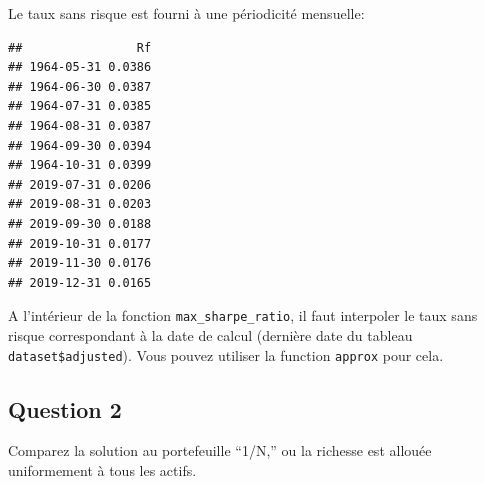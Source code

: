 \documentclass[
]{article}
\newenvironment{Shaded}{\begin{snugshade}}{\end{snugshade}}
\newcommand{\AttributeTok}[1]{\textcolor[rgb]{0.77,0.63,0.00}{#1}}
\newcommand{\ConstantTok}[1]{\textcolor[rgb]{0.00,0.00,0.00}{#1}}
\newcommand{\DecValTok}[1]{\textcolor[rgb]{0.00,0.00,0.81}{#1}}
\newcommand{\FloatTok}[1]{\textcolor[rgb]{0.00,0.00,0.81}{#1}}
\newcommand{\FunctionTok}[1]{\textcolor[rgb]{0.00,0.00,0.00}{#1}}
\newcommand{\NormalTok}[1]{#1}
\newcommand{\OtherTok}[1]{\textcolor[rgb]{0.56,0.35,0.01}{#1}}
\newcommand{\SpecialCharTok}[1]{\textcolor[rgb]{0.00,0.00,0.00}{#1}}
\newcommand{\StringTok}[1]{\textcolor[rgb]{0.31,0.60,0.02}{#1}}
\begin{document}
Le taux sans risque est fourni à une périodicité mensuelle:

\begin{Shaded}
\end{Shaded}

\begin{verbatim}
##                Rf
## 1964-05-31 0.0386
## 1964-06-30 0.0387
## 1964-07-31 0.0385
## 1964-08-31 0.0387
## 1964-09-30 0.0394
## 1964-10-31 0.0399
## 2019-07-31 0.0206
## 2019-08-31 0.0203
## 2019-09-30 0.0188
## 2019-10-31 0.0177
## 2019-11-30 0.0176
## 2019-12-31 0.0165
\end{verbatim}

A l'intérieur de la fonction \texttt{max\_sharpe\_ratio}, il faut
interpoler le taux sans risque correspondant à la date de calcul
(dernière date du tableau \texttt{dataset\$adjusted}). Vous pouvez
utiliser la function \texttt{approx} pour cela.

\hypertarget{question-2}{%
\subsection{Question 2}\label{question-2}}

Comparez la solution au portefeuille ``1/N,'' ou la richesse est allouée
uniformement à tous les actifs.
\end{document}
